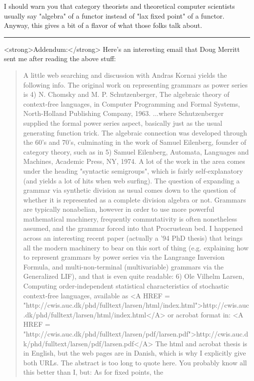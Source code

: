 I should warn you that category theorists and theoretical computer
scientists usually say "algebra" of a functor instead of "lax fixed
point" of a functor.  Anyway, this gives a bit of a flavor of what those
folks talk about.
\par\noindent\rule{\textwidth}{0.4pt}
<strong>Addendum:</strong>
Here's an interesting email that Doug Merritt sent me after
reading the above stuff:
\begin{quote}
A little web searching and discussion with Andras Kornai yields the
following info.
The original work on representing grammars as power series is
4) N. Chomsky and M. P. Schutzenberger, The algebraic theory of 
context-free languages, in Computer Programming and Formal Systems,
North-Holland Publishing Company, 1963.
...where Schutzenberger supplied the formal power series aspect, basically
just as the usual generating function trick.
The algebraic connection was developed through the 60's and 70's,
culminating in the work of Samuel Eilenberg, founder of category
theory, such as in
5) Samuel Eilenberg, Automata, Languages and Machines, Academic Press, 
NY, 1974.
A lot of the work in the area comes under the heading "syntactic semigroups",
which is fairly self-explanatory (and yields a lot of hits when web surfing).
The question of expanding a grammar via synthetic division as usual
comes down to the question of whether it is represented as a complete
division algebra or not. Grammars are typically nonabelian, however
in order to use more powerful mathematical machinery, frequently commutativity
is often nonetheless assumed, and the grammar forced into that Procrustean bed.
I happened across an interesting recent paper (actually a '94 PhD thesis)
that brings all the modern machinery to bear on this sort of thing (e.g.
explaining how to represent grammars by power series via the Langrange
Inversion Formula, and multi-non-terminal (multivariable) grammars via
the Generalized LIF), and that is even quite readable:
6) Ole Vilhelm Larsen, Computing order-independent statistical
characteristics of stochastic context-free languages, available 
as   <A HREF =
"http://cwis.auc.dk/phd/fulltext/larsen/html/index.html">http://cwis.auc.dk/phd/fulltext/larsen/html/index.html</A>
or acrobat format in:  <A HREF = "http://cwis.auc.dk/phd/fulltext/larsen/pdf/larsen.pdf">http://cwis.auc.dk/phd/fulltext/larsen/pdf/larsen.pdf</A>
The html and acrobat thesis is in English, but the web pages are in Danish,
which is why I explicitly give both URLs. The abstract is too long to quote
here.
You probably know all this better than I, but: As for fixed points, the

\end{quote}
